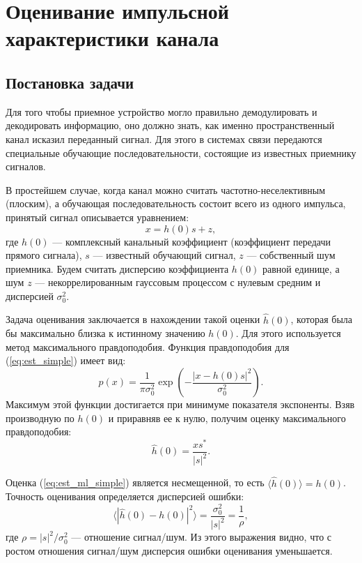 \clearpage
\section{Оценивание импульсной характеристики канала}
\label{sec:estimation}

\subsection{Постановка задачи}

Для того чтобы приемное устройство могло правильно демодулировать и декодировать информацию, оно должно знать, как именно пространственный канал исказил переданный сигнал. Для этого в системах связи передаются специальные обучающие последовательности, состоящие из известных приемнику сигналов.

В простейшем случае, когда канал можно считать частотно-неселективным (плоским), а обучающая последовательность состоит всего из одного импульса, принятый сигнал описывается уравнением:
\begin{equation}
    x = h(0) s + z,
    \label{eq:est_simple}
\end{equation}
где $h(0)$ --- комплексный канальный коэффициент (коэффициент передачи прямого сигнала), $s$ --- известный обучающий сигнал, $z$ --- собственный шум приемника. Будем считать дисперсию коэффициента $h(0)$ равной единице, а шум $z$ --- некоррелированным гауссовым процессом с нулевым средним и дисперсией $\sigma_0^2$.

Задача оценивания заключается в нахождении такой оценки $\hat{h}(0)$, которая была бы максимально близка к истинному значению $h(0)$. Для этого используется метод максимального правдоподобия. Функция правдоподобия для (\ref{eq:est_simple}) имеет вид:
\begin{equation}
    p(x) = \frac{1}{\pi\sigma_0^2} \exp\left(-\frac{|x - h(0) s|^2}{\sigma_0^2}\right).
\end{equation}
Максимум этой функции достигается при минимуме показателя экспоненты. Взяв производную по $h(0)$ и приравняв ее к нулю, получим оценку максимального правдоподобия:
\begin{equation}
    \hat{h}(0) = \frac{x s^*}{|s|^2}.
    \label{eq:est_ml_simple}
\end{equation}

Оценка (\ref{eq:est_ml_simple}) является несмещенной, то есть $\langle \hat{h}(0) \rangle = h(0)$. Точность оценивания определяется дисперсией ошибки:
\begin{equation}
    \langle |\hat{h}(0) - h(0)|^2 \rangle = \frac{\sigma_0^2}{|s|^2} = \frac{1}{\rho},
\end{equation}
где $\rho = |s|^2 / \sigma_0^2$ --- отношение сигнал/шум. Из этого выражения видно, что с ростом отношения сигнал/шум дисперсия ошибки оценивания уменьшается.

